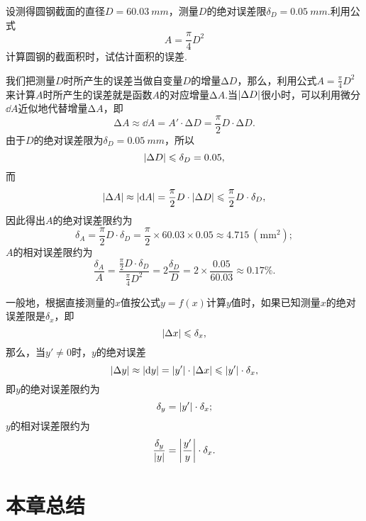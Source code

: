 \begin{example}
设测得圆钢截面的直径\(D = 60.03\ mm\)，测量\(D\)的绝对误差限\(\delta_D = 0.05\ mm\).利用公式\[
A = \frac{\pi}{4} D^2
\]计算圆钢的截面积时，试估计面积的误差.
\begin{solution}
我们把测量\(D\)时所产生的误差当做自变量\(D\)的增量\(\increment D\)，那么，利用公式\(A = \frac{\pi}{4} D^2\)来计算\(A\)时所产生的误差就是函数\(A\)的对应增量\(\increment A\).当\(\abs{\Delta D}\)很小时，可以利用微分\(\dd A\)近似地代替增量\(\increment A\)，即\[
\increment A \approx \dd A = A' \cdot \increment D = \frac{\pi}{2} D \cdot \increment D.
\]由于\(D\)的绝对误差限为\(\delta_D = 0.05\ mm\)，所以\[
\abs{\Delta D} \leqslant \delta_D = 0.05,
\]而\[
\abs{\Delta A} \approx \abs{\dd A} = \frac{\pi}{2} D \cdot \abs{\Delta D} \leqslant \frac{\pi}{2} D \cdot \delta_D,
\]因此得出\(A\)的绝对误差限约为\[
\delta_A = \frac{\pi}{2} D \cdot \delta_D = \frac{\pi}{2} \times 60.03 \times 0.05 \approx 4.715\ (\mathrm{mm}^2);
\]\(A\)的相对误差限约为\[
\frac{\delta_A}{A} = \frac{\frac{\pi}{2} D \cdot \delta_D}{\frac{\pi}{4} D^2}
= 2 \frac{\delta_D}{D} = 2 \times \frac{0.05}{60.03} \approx 0.17\%.
\]
\end{solution}
\end{example}

一般地，根据直接测量的\(x\)值按公式\(y = f(x)\)计算\(y\)值时，如果已知测量\(x\)的绝对误差限是\(\delta_x\)，即\[
\abs{\Delta x} \leqslant \delta_x,
\]那么，当\(y' \neq 0\)时，\(y\)的绝对误差\[
\abs{\Delta y} \approx \abs{\dd{y}} = \abs{y'} \cdot \abs{\Delta x} \leqslant \abs{y'} \cdot \delta_x,
\]即\(y\)的绝对误差限约为\[
\delta_y = \abs{y'} \cdot \delta_x;
\]\(y\)的相对误差限约为\[
\frac{\delta_y}{\abs{y}} = \abs{\frac{y'}{y}} \cdot \delta_x.
\]

\section{本章总结}
